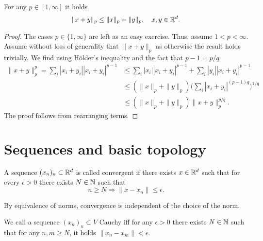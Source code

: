 \begin{theorem}
    For any $p\in[1,\infty]$ it holds
    \begin{equation}
        \|x+y\|_p\leq \|x\|_p+\|y\|_p,\quad x,y\in\mathbb{R}^d.
    \end{equation}
\end{theorem}
\begin{proof}
    The cases $p\in\{1,\infty\}$ are left as an easy exercise. Thus, assume $1<p<\infty$. Assume without loss of generality that $\|x+y\|_p$ as otherwise the result holds trivially. We find using Hölder's inequality and the fact that $p-1 = p/q$
    \begin{equation}
        \begin{aligned}
            \|x+y\|_p^p 
            = \sum_i |x_i+y_i||x_i+y_i|^{p-1}
            &\leq \sum_i |x_i||x_i+y_i|^{p-1} + \sum_i |y_i||x_i+y_i|^{p-1}\\
            &\leq (\|x\|_p + \|y\|_p) \bigg(\sum_i |x_i+y_i|^{(p-1)q}\bigg)^{1/q}\\
            &\leq (\|x\|_p + \|y\|_p) \|x+y\|_p^{p/q}.
        \end{aligned}
    \end{equation}
    The proof follows from rearranging terms.
\end{proof}

\section{Sequences and basic topology}

\begin{defn}
    A sequence $(x_n)_n\subset\mathbb{R}^d$ is called convergent if there exists $x\in \mathbb{R}^d$ such that for every $\epsilon>0$ there exists $N\in\mathbb{N}$ such that 
    \begin{equation}
        n\geq N\Rightarrow \|x-x_n\|\leq \epsilon.
    \end{equation}
\end{defn}

\begin{rem}
    By equivalence of norms, convergence is independent of the choice of the norm.
\end{rem}

\begin{defn}
    We call a sequence $(x_n)_n\subset V$ Cauchy iff for any $\epsilon>0$ there exists $N\in \mathbb{N}$ such that for any $n,m\geq N$, it holds $\|x_n-x_m\|<\epsilon$.
\end{defn}

